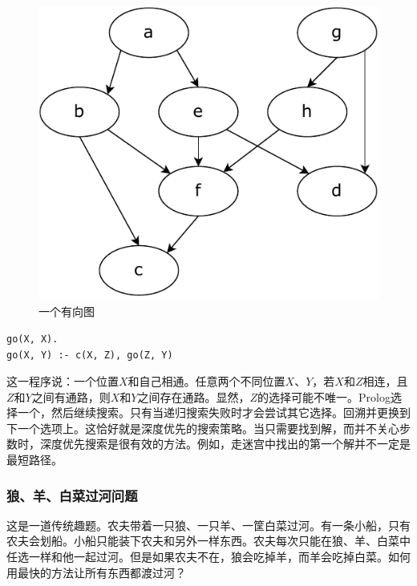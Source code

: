 \documentclass[b5paper]{ctexart}
\begin{document}
\begin{figure}[htbp]
 \centering
 \includegraphics[scale=0.5]{img/directed-graph}
 \caption{一个有向图}
 \label{fig:directed-graph}
\end{figure}

\lstset{language=Prolog}
\begin{lstlisting}
go(X, X).
go(X, Y) :- c(X, Z), go(Z, Y)
\end{lstlisting}

这一程序说：一个位置$X$和自己相通。任意两个不同位置$X$、$Y$，若$X$和$Z$相连，且$Z$和$Y$之间有通路，则$X$和$Y$之间存在通路。显然，$Z$的选择可能不唯一。Prolog选择一个，然后继续搜索。只有当递归搜索失败时才会尝试其它选择。回溯并更换到下一个选项上。这恰好就是深度优先的搜索策略。当只需要找到解，而并不关心步数时，深度优先搜索是很有效的方法。例如，走迷宫中找出的第一个解并不一定是最短路径。

\begin{Exercise}
\end{Exercise}

\subsubsection{狼、羊、白菜过河问题}

这是一道传统趣题。农夫带着一只狼、一只羊、一筐白菜过河。有一条小船，只有农夫会划船。小船只能装下农夫和另外一样东西。农夫每次只能在狼、羊、白菜中任选一样和他一起过河。但是如果农夫不在，狼会吃掉羊，而羊会吃掉白菜。如何用最快的方法让所有东西都渡过河？
\end{document}
